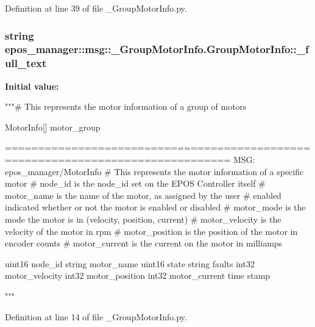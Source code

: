 \-Definition at line 39 of file \-\_\-\-Group\-Motor\-Info.\-py.

\subsubsection[{\-\_\-full\-\_\-text}]{\setlength{\rightskip}{0pt plus 5cm}string {\bf epos\-\_\-manager\-::msg\-::\-\_\-\-Group\-Motor\-Info.\-Group\-Motor\-Info\-::\-\_\-full\-\_\-text}\hspace{0.3cm}{\ttfamily  [static, private]}}\label{classepos__manager_1_1msg_1_1__GroupMotorInfo_1_1GroupMotorInfo_af338cf3950355e3ad9d8bf4f299cf1b9}
{\bfseries \-Initial value\-:}
\begin{DoxyCode}
"""# This represents the motor information of a group of motors

MotorInfo[] motor_group


      ================================================================================
MSG: epos_manager/MotorInfo
# This represents the motor information of a specific motor
# node_id is the node_id set on the EPOS Controller itself
# motor_name is the name of the motor, as assigned by the user
# enabled indicated whether or not the motor is enabled or disabled
# motor_mode is the mode the motor is in (velocity, position, current)
# motor_velocity is the velocity of the motor in rpm
# motor_position is the position of the motor in encoder counts
# motor_current is the current on the motor in milliamps

uint16 node_id
string motor_name
uint16 state
string faults
int32 motor_velocity
int32 motor_position
int32 motor_current
time stamp

"""
\end{DoxyCode}


\-Definition at line 14 of file \-\_\-\-Group\-Motor\-Info.\-py.

